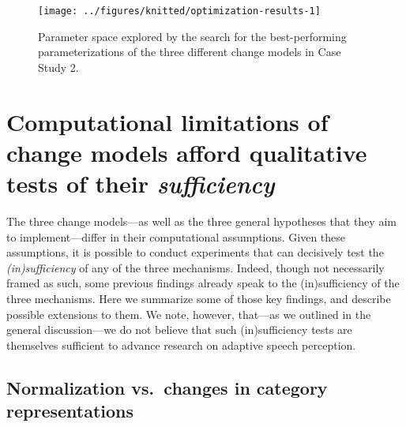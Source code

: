 \documentclass[
  11pt,
  man,floatsintext]{apa6}
\begin{document}
\begin{figure}

{\centering \texttt{[image: ../figures/knitted/optimization-results-1]} 

}

\caption{Parameter space explored by the search for the best-performing parameterizations of the three different change models in Case Study 2.}\label{fig:optimization-results}
\end{figure}

\hypertarget{sec:sufficiency}{%
\section{\texorpdfstring{Computational limitations of change models afford qualitative tests of their \emph{sufficiency}}{Computational limitations of change models afford qualitative tests of their sufficiency}}\label{sec:sufficiency}}

The three change models---as well as the three general hypotheses that they aim to implement---differ in their computational assumptions. Given these assumptions, it is possible to conduct experiments that can decisively test the \emph{(in)sufficiency} of any of the three mechanisms. Indeed, though not necessarily framed as such, some previous findings already speak to the (in)sufficiency of the three mechanisms. Here we summarize some of those key findings, and describe possible extensions to them. We note, however, that---as we outlined in the general discussion---we do not believe that such (in)sufficiency tests are themselves sufficient to advance research on adaptive speech perception.

\hypertarget{normalization-vs.-changes-in-category-representations}{%
\subsection{Normalization vs.~changes in category representations}\label{normalization-vs.-changes-in-category-representations}}
\end{document}
